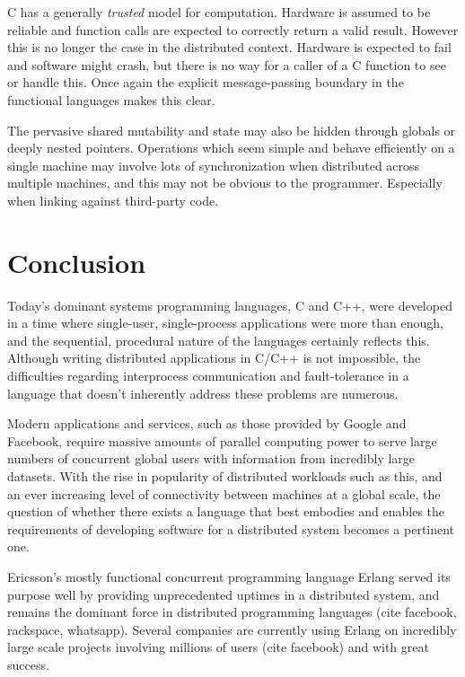 \documentclass[10pt,a4paper,twocolumn]{article}
\begin{document}
C has a generally \emph{trusted} model for computation. Hardware is assumed to
be reliable and function calls are expected to correctly return a valid result.
However this is no longer the case in the distributed context. Hardware is
expected to fail and software might crash, but there is no way for a caller of a
C function to see or handle this. Once again the explicit message-passing
boundary in the functional languages makes this clear.

The pervasive shared mutability and state may also be hidden through globals or
deeply nested pointers. Operations which seem simple and behave efficiently on a
single machine may involve lots of synchronization when distributed across
multiple machines, and this may not be obvious to the programmer. Especially
when linking against third-party code.

\section{Conclusion}

Today's dominant systems programming languages, C and C++, were developed in a
time where single-user, single-process applications were more than enough, and
the sequential, procedural nature of the languages certainly reflects this.
Although writing distributed applications in C/C++ is not impossible, the
difficulties regarding interprocess communication and fault-tolerance in a
language that doesn't inherently address these problems are numerous.

Modern applications and services, such as those provided by Google and Facebook,
require massive amounts of parallel computing power to serve large numbers of
concurrent global users with information from incredibly large datasets. With
the rise in popularity of distributed workloads such as this, and an ever
increasing level of connectivity between machines at a global scale, the
question of whether there exists a language that best embodies and enables the
requirements of developing software for a distributed system becomes a pertinent
one.

Ericsson's mostly functional concurrent programming language Erlang served its
purpose well by providing unprecedented uptimes in a distributed system, and
remains the dominant force in distributed programming languages (cite facebook,
rackspace, whatsapp). Several companies are currently using Erlang on incredibly
large scale projects involving millions of users (cite facebook) and with great
success.
\end{document}
